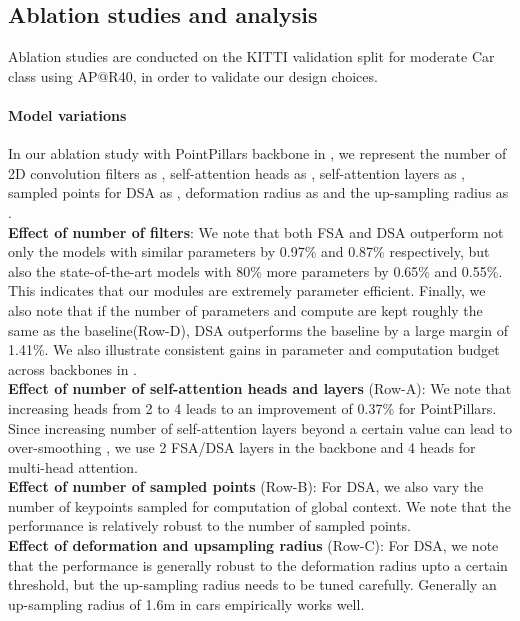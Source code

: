 \documentclass[10pt,twocolumn,letterpaper]{article}
\begin{document}
\subsection{Ablation studies and analysis}
Ablation studies are conducted on the KITTI validation split \cite{MV3D} for moderate Car class using AP@R40, in order to validate our design choices.
\vspace{-0.4cm}
\paragraph{Model variations} In our ablation study with PointPillars backbone in , we represent the number of 2D convolution filters as , self-attention heads as , self-attention layers as , sampled points for DSA as , deformation radius as  and the up-sampling radius as . 
\\ \textbf{Effect of number of filters}: We note that both FSA and DSA outperform not only the models with similar parameters by 0.97\% and 0.87\% respectively, but also the state-of-the-art models with 80\% more parameters by 0.65\% and 0.55\%. This indicates that our modules are extremely parameter efficient. Finally, we also note that if the number of parameters and compute are kept roughly the same as the baseline(Row-D), DSA outperforms the baseline by a large margin of 1.41\%. We also illustrate consistent gains in parameter and computation budget across backbones in . 
\\ \textbf{Effect of number of self-attention heads and layers} (Row-A):  We note that increasing heads from 2 to 4 leads to an improvement of 0.37\% for PointPillars. Since increasing number of self-attention layers beyond a certain value can lead to over-smoothing \cite{oversmoothing}, we use 2 FSA/DSA layers in the backbone and 4 heads for multi-head attention. 
\\ \textbf{Effect of number of sampled points} (Row-B): For DSA, we also vary the number of keypoints sampled for computation of global context. We note that the performance is relatively robust to the number of sampled points. 
\\ \textbf{Effect of deformation and upsampling radius} (Row-C): For DSA, we note that the performance is generally robust to the deformation radius upto a certain threshold, but the up-sampling radius needs to be tuned carefully. Generally an up-sampling radius of 1.6m in cars empirically works well. 
\vspace{-0.4cm}
\end{document}
